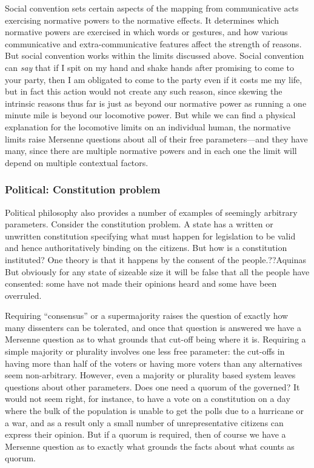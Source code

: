 Social convention sets certain aspects of the mapping from communicative acts exercising normative powers to the normative
effects. It determines which normative powers are exercised in which words or gestures, and how various communicative and
extra-communicative features affect the strength of reasons. But social convention works within the limits discussed
above. Social convention can \textit{say} that if I spit on my hand and shake hands after promising to come to your
party, then I am obligated to come to the party even if it costs me my life, but in fact this action would not create
any such reason, since skewing the intrinsic reasons thus far is just as beyond our normative power as running a one minute
mile is beyond our locomotive power. But while we can find a physical explanation for the locomotive limits on an 
individual human, the normative limits raise Mersenne questions about all of their free parameters---and they have many,
since there are multiple normative powers and in each one the limit will depend on multiple contextual factors.

\subsubsection{Political: Constitution problem}
Political philosophy also provides a number of examples of seemingly arbitrary parameters. Consider the constitution problem. A state has a written or unwritten
constitution specifying what must happen for legislation to be valid and hence authoritatively binding on the citizens. But 
how is a constitution instituted? One theory is that it happens by the consent of the people.??Aquinas But obviously for any state
of sizeable size it will be false that all the people have consented: some have not made their opinions heard and some have been
overruled. 

Requiring ``consensus'' or a supermajority raises the question of exactly how many dissenters can be tolerated, and
once that question is answered we have a Mersenne question as to what grounds that cut-off being where it is. Requiring a simple
majority or plurality involves one less free parameter: the cut-offs in having more than half of the voters or having more voters
than any alternatives seem non-arbitrary. However, even a majority or plurality based system leaves questions about other parameters.
Does one need a quorum of the governed? It would not seem right, for instance, to have a vote on a constitution on a day 
where the bulk of the population is unable to get the polls due to a hurricane or a war, and as a result only a small number of
unrepresentative citizens can express their opinion. But if a quorum is required, then of course we have a Mersenne question
as to exactly what grounds the facts about what counts as quorum.

